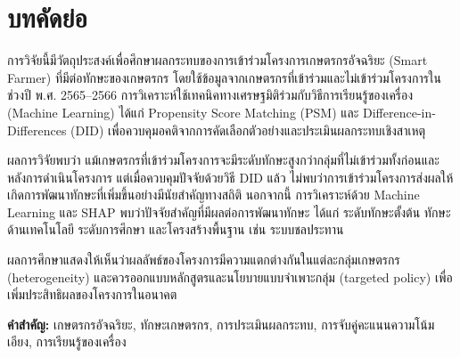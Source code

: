 \chapter*{บทคัดย่อ}

การวิจัยนี้มีวัตถุประสงค์เพื่อศึกษาผลกระทบของการเข้าร่วมโครงการเกษตรกรอัจฉริยะ (Smart Farmer) ที่มีต่อทักษะของเกษตรกร โดยใช้ข้อมูลจากเกษตรกรที่เข้าร่วมและไม่เข้าร่วมโครงการในช่วงปี พ.ศ. 2565–2566 การวิเคราะห์ใช้เทคนิคทางเศรษฐมิติร่วมกับวิธีการเรียนรู้ของเครื่อง (Machine Learning) ได้แก่ Propensity Score Matching (PSM) และ Difference-in-Differences (DID) เพื่อควบคุมอคติจากการคัดเลือกตัวอย่างและประเมินผลกระทบเชิงสาเหตุ

ผลการวิจัยพบว่า แม้เกษตรกรที่เข้าร่วมโครงการจะมีระดับทักษะสูงกว่ากลุ่มที่ไม่เข้าร่วมทั้งก่อนและหลังการดำเนินโครงการ แต่เมื่อควบคุมปัจจัยด้วยวิธี DID แล้ว ไม่พบว่าการเข้าร่วมโครงการส่งผลให้เกิดการพัฒนาทักษะที่เพิ่มขึ้นอย่างมีนัยสำคัญทางสถิติ นอกจากนี้ การวิเคราะห์ด้วย Machine Learning และ SHAP พบว่าปัจจัยสำคัญที่มีผลต่อการพัฒนาทักษะ ได้แก่ ระดับทักษะตั้งต้น ทักษะด้านเทคโนโลยี ระดับการศึกษา และโครงสร้างพื้นฐาน เช่น ระบบชลประทาน

ผลการศึกษาแสดงให้เห็นว่าผลลัพธ์ของโครงการมีความแตกต่างกันในแต่ละกลุ่มเกษตรกร (heterogeneity) และควรออกแบบหลักสูตรและนโยบายแบบจำเพาะกลุ่ม (targeted policy) เพื่อเพิ่มประสิทธิผลของโครงการในอนาคต

\vspace{0.5cm}
\textbf{คำสำคัญ:} เกษตรกรอัจฉริยะ, ทักษะเกษตรกร, การประเมินผลกระทบ, การจับคู่คะแนนความโน้มเอียง, การเรียนรู้ของเครื่อง